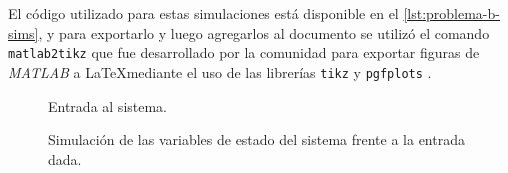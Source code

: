 El código utilizado para estas simulaciones está disponible en el \autoref{lst:problema-b-sims},
y para exportarlo y luego agregarlos al documento se utilizó el comando \texttt{matlab2tikz}
\cite{m2tikz} que fue desarrollado por la comunidad para exportar figuras de \textit{MATLAB} a
\LaTeX mediante el uso de las librerías \texttt{tikz} \cite{pgf} y \texttt{pgfplots}
\cite{pgfplots}.

\begin{figure}[h]
  \centering
  
  \caption{Entrada al sistema.}\label{fig:entrada-sim}
\end{figure}

\begin{figure}[h]
  \centering
  
  \caption{Simulación de las variables de estado del sistema frente a la entrada dada.}\label{fig:estado-sim}
\end{figure}
